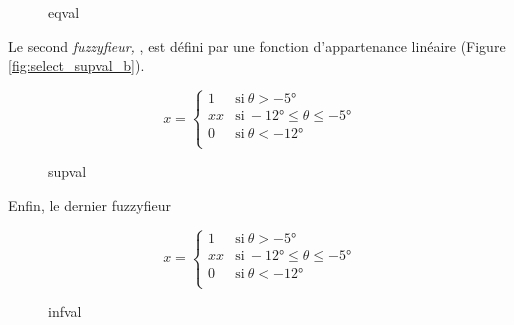 \begin{figure}
  \centering
  \subfloat[eqval]{
    
    \label{fig:select_eqval_b}
  }
  
  \subfloat[eqval0]{
    
    \label{fig:select_eqval_0}
  }\hfill  
  \subfloat[eqvalangle]{
    
    \label{fig:select_eqval_ang}
  }  
  \caption{eqval}
  \label{fig:select_eqval}
\end{figure}

Le second \emph{fuzzyfieur,} , est défini par une fonction d'appartenance linéaire (Figure \ref{fig:select_supval_b}).

\begin{equation}
  \label{eq:sup_val}
  x = \left\{
    \begin{array}{ll}
      1 & \text{si}\ θ > -5° \\
      xx & \text{si}\ -12° ≤ θ ≤ -5° \\
      0 & \text{si}\ θ < -12°\\
    \end{array}
  \right.
\end{equation}

\begin{figure}
  \centering
  \subfloat[supval]{
    
    \label{fig:select_supval_b}
  }\hfill
  \subfloat[supval0]{
    
    \label{fig:select_supval_0}
  }
  \caption{supval}
  \label{fig:select_supval}
\end{figure}

Enfin, le dernier fuzzyfieur

\begin{equation}
  \label{eq:inf_val}
  x = \left\{
    \begin{array}{ll}
      1 & \text{si}\ θ > -5° \\
      xx & \text{si}\ -12° ≤ θ ≤ -5° \\
      0 & \text{si}\ θ < -12°\\
    \end{array}
  \right.
\end{equation}

\begin{figure}
  \centering
  \subfloat[infval]{
    
  }\hfill
  \subfloat[infval0]{
    
  }

  \caption{infval}
  \label{fig:select_infval}
\end{figure}

